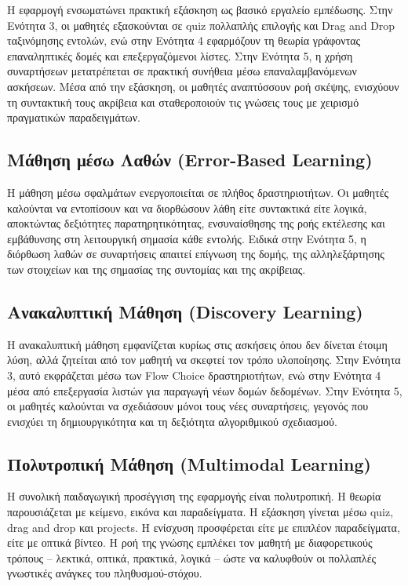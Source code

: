 \documentclass[11pt]{report}
\begin{document}
Η εφαρμογή ενσωματώνει πρακτική εξάσκηση ως βασικό εργαλείο εμπέδωσης. Στην Ενότητα 3, οι μαθητές εξασκούνται σε quiz πολλαπλής επιλογής και Drag and Drop ταξινόμησης εντολών, ενώ στην Ενότητα 4 εφαρμόζουν τη θεωρία γράφοντας επαναληπτικές δομές και επεξεργαζόμενοι λίστες. Στην Ενότητα 5, η χρήση συναρτήσεων μετατρέπεται σε πρακτική συνήθεια μέσω επαναλαμβανόμενων ασκήσεων. Μέσα από την εξάσκηση, οι μαθητές αναπτύσσουν ροή σκέψης, ενισχύουν τη συντακτική τους ακρίβεια και σταθεροποιούν τις γνώσεις τους με χειρισμό πραγματικών παραδειγμάτων. 

\subsection*{Μάθηση μέσω Λαθών (Error-Based Learning) }

Η μάθηση μέσω σφαλμάτων ενεργοποιείται σε πλήθος δραστηριοτήτων. Οι μαθητές καλούνται να εντοπίσουν και να διορθώσουν λάθη είτε συντακτικά είτε λογικά, αποκτώντας δεξιότητες παρατηρητικότητας, ενσυναίσθησης της ροής εκτέλεσης και εμβάθυνσης στη λειτουργική σημασία κάθε εντολής. Ειδικά στην Ενότητα 5, η διόρθωση λαθών σε συναρτήσεις απαιτεί επίγνωση της δομής, της αλληλεξάρτησης των στοιχείων και της σημασίας της συντομίας και της ακρίβειας. 

\subsection*{Ανακαλυπτική Μάθηση (Discovery Learning)  }

Η ανακαλυπτική μάθηση εμφανίζεται κυρίως στις ασκήσεις όπου δεν δίνεται έτοιμη λύση, αλλά ζητείται από τον μαθητή να σκεφτεί τον τρόπο υλοποίησης. Στην Ενότητα 3, αυτό εκφράζεται μέσω των Flow Choice δραστηριοτήτων, ενώ στην Ενότητα 4 μέσα από επεξεργασία λιστών για παραγωγή νέων δομών δεδομένων. Στην Ενότητα 5, οι μαθητές καλούνται να σχεδιάσουν μόνοι τους νέες συναρτήσεις, γεγονός που ενισχύει τη δημιουργικότητα και τη δεξιότητα αλγοριθμικού σχεδιασμού. 

\subsection*{Πολυτροπική Μάθηση (Multimodal Learning)}

Η συνολική παιδαγωγική προσέγγιση της εφαρμογής είναι πολυτροπική. Η θεωρία παρουσιάζεται με κείμενο, εικόνα και παραδείγματα. Η εξάσκηση γίνεται μέσω quiz, drag and drop και projects. Η ενίσχυση προσφέρεται είτε με επιπλέον παραδείγματα, είτε με οπτικά βίντεο. Η ροή της γνώσης εμπλέκει τον μαθητή με διαφορετικούς τρόπους – λεκτικά, οπτικά, πρακτικά, λογικά – ώστε να καλυφθούν οι πολλαπλές γνωστικές ανάγκες του πληθυσμού-στόχου. 
\end{document}
